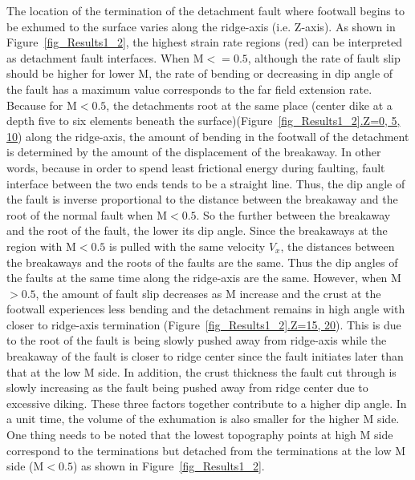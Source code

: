 The location of the termination of the detachment fault where footwall begins to be exhumed to the surface varies along the ridge-axis (i.e. Z-axis). As shown in Figure~\hyperref[fig_Results1_2]{\ref{fig_Results1_2}}, the highest strain rate regions (red) can be interpreted as detachment fault interfaces. When M$<=0.5$, although the rate of fault slip should be higher for lower M, the rate of bending or decreasing in dip angle of the fault has a maximum value corresponds to the far field extension rate. Because for M$<0.5$, the detachments root at the same place (center dike at a depth five to six elements beneath the surface)(Figure~\hyperref[fig_Results1_2]{\ref{fig_Results1_2}.Z=0, 5, 10}) along the ridge-axis, the amount of bending in the footwall of the detachment is determined by the amount of the displacement of the breakaway. In other words, because in order to spend least frictional energy during faulting, fault interface between the two ends tends to be a straight line. Thus, the dip angle of the fault is inverse proportional to the distance between the breakaway and the root of the normal fault when M$<0.5$. So the further between the breakaway and the root of the fault, the lower its dip angle. Since the breakaways at the region with M$<0.5$ is pulled with the same velocity $V_{x}$, the distances between the breakaways and the roots of the faults are the same. Thus the dip angles of the faults at the same time along the ridge-axis are the same. However, when M$>0.5$, the amount of fault slip decreases as M increase and the crust at the footwall experiences less bending and the detachment remains in high angle with closer to ridge-axis termination (Figure~\hyperref[fig_Results1_2]{\ref{fig_Results1_2}.Z=15, 20}). This is due to the root of the fault is being slowly pushed away from ridge-axis while the breakaway of the fault is closer to ridge center since the fault initiates later than that at the low M side. In addition, the crust thickness the fault cut through is slowly increasing as the fault being pushed away from ridge center due to excessive diking. These three factors together contribute to a higher dip angle. In a unit time, the volume of the exhumation is also smaller for the higher M side. One thing needs to be noted that the lowest topography points at high M side correspond to the terminations but detached from the terminations at the low M side (M$<0.5$) as shown in Figure~\hyperref[fig_Results1_2]{\ref{fig_Results1_2}}.        

